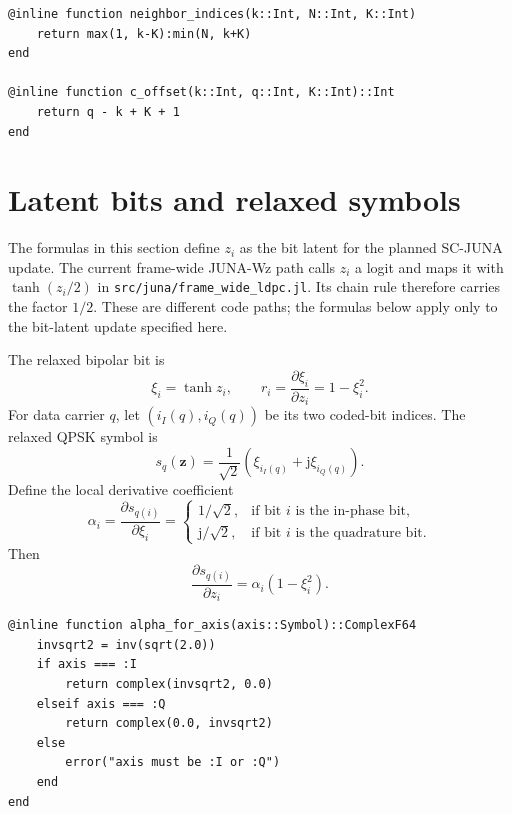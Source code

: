 \documentclass[11pt]{article}
\newcommand{\jj}{\mathrm{j}}
\begin{document}
\begin{lstlisting}
@inline function neighbor_indices(k::Int, N::Int, K::Int)
    return max(1, k-K):min(N, k+K)
end

@inline function c_offset(k::Int, q::Int, K::Int)::Int
    return q - k + K + 1
end
\end{lstlisting}

\section{Latent bits and relaxed symbols}

The formulas in this section define $z_i$ as the bit latent for the planned
SC-JUNA update.  The current frame-wide JUNA-Wz path calls $z_i$ a logit and
maps it with $\tanh(z_i/2)$ in
\texttt{src/juna/frame\_wide\_ldpc.jl}.  Its chain rule therefore carries the
factor $1/2$.  These are different code paths; the formulas below apply only
to the bit-latent update specified here.

The relaxed bipolar bit is
\begin{equation}
\xi_i=\tanh z_i,
\qquad
r_i=\frac{\partial \xi_i}{\partial z_i}=1-\xi_i^2.
\end{equation}
For data carrier $q$, let $(i_I(q),i_Q(q))$ be its two coded-bit indices.  The relaxed QPSK symbol is
\begin{equation}
 s_q(\bm z)=\frac{1}{\sqrt2}\left(\xi_{i_I(q)}+\jj\xi_{i_Q(q)}\right).
\end{equation}
Define the local derivative coefficient
\begin{equation}
\alpha_i=\frac{\partial s_{q(i)}}{\partial \xi_i}
=\begin{cases}
1/\sqrt2, & \text{if bit }i\text{ is the in-phase bit},\\
\jj/\sqrt2, & \text{if bit }i\text{ is the quadrature bit}.
\end{cases}
\end{equation}
Then
\begin{equation}
\frac{\partial s_{q(i)}}{\partial z_i}=\alpha_i(1-\xi_i^2).
\end{equation}

\begin{lstlisting}
@inline function alpha_for_axis(axis::Symbol)::ComplexF64
    invsqrt2 = inv(sqrt(2.0))
    if axis === :I
        return complex(invsqrt2, 0.0)
    elseif axis === :Q
        return complex(0.0, invsqrt2)
    else
        error("axis must be :I or :Q")
    end
end
\end{lstlisting}
\end{document}
